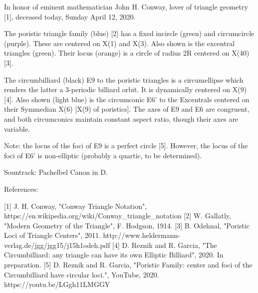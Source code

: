 In honor of eminent mathematician John H. Conway, lover of triangle geometry [1], deceased today, Sunday April 12, 2020.

The poristic triangle family (blue) [2] has a fixed incircle (green) and circumcircle (purple). These are centered on X(1) and X(3). Also shown is the excentral triangles (green). Their locus (orange) is a circle of radius 2R centered on X(40) [3].

The circumbilliard (black) E9 to the poristic triangles is a circumellipse which renders the latter a 3-periodic billiard orbit. It is dynamically centered on X(9) [4]. Also shown (light blue) is the circumconic E6' to the Excentrals centered on their Symmedian X(6) [X(9) of poristics]. The axes of E9 and E6 are congruent, and both circumconics maintain constant aspect ratio, though their axes are variable.

Note: the locus of the foci of E9 is a perfect circle [5]. However, the locus of the foci of E6' is non-elliptic (probably a quartic, to be determined). 

Sountrack: Pachelbel Canon in D.

References:

[1] J. H. Conway, "Conway Triangle Notation", https://en.wikipedia.org/wiki/Conway_triangle_notation
[2] W. Gallatly, "Modern Geometry of the Triangle", F. Hodgson, 1914.
[3] B. Odehnal, "Poristic Loci of Triangle Centers", 2011. http://www.heldermann-verlag.de/jgg/jgg15/j15h1odeh.pdf
[4] D. Reznik and R. Garcia, "The Circumbilliard: any triangle can have its own Elliptic Billiard", 2020. In preparation.
[5] D. Reznik and R. Garcia, "Poristic Family: center and foci of the Circumbilliard have circular loci.", YouTube, 2020. https://youtu.be/LGgh11LMGGY